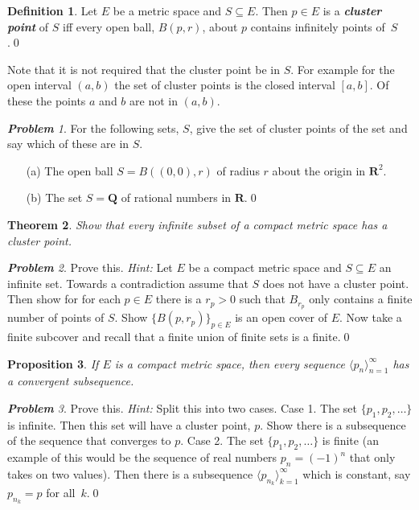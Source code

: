 \documentclass[11pt]{amsart}
\newcommand{\bi}[1]{{\bf\itshape #1\/}}  %
\renewcommand{\(}{\left(}
\renewcommand{\)}{\right)}
\renewcommand{\[}{\left[}
\renewcommand{\]}{\right]}
\newtheorem{thm}{Theorem}
\newtheorem{prop}[thm]{Proposition}
\theoremstyle{definition}
\newtheorem{defn}[thm]{Definition}
\theoremstyle{remark}
\newtheorem{prob}{{\bf Problem}}
\newcommand{\R}{{\mathbf R}}   %
\newcommand{\la}{\langle}
\newcommand{\ra}{\rangle}
\newcommand{\hint}{{\emph{Hint:} }}
\begin{document}
\begin{defn}
Let $E$ be a metric space and $S\subseteq E$.  Then $p\in E$ is a 
\bi{cluster point} of $S$ iff every open ball, $B(p,r)$, about $p$
contains infinitely points of~$S$.\qed
\end{defn}

Note that it is not required that the cluster point be in $S$.  For
example for the open interval $(a,b)$ the set of cluster points is the
closed interval $[a,b]$.  Of these the points $a$ and $b$ are not in $(a,b)$.

\begin{prob}
For the following sets, $S$, give the set of cluster points of the set and
say which of these are in $S$.
\begin{enumerate}
\item[(a)]  The open ball $S=B((0,0),r)$ of radius $r$ about the
  origin in $\R^2$.
\item[(b)] The set $S=\mathbf Q$ of rational numbers in $\R$.\qed
\end{enumerate}
\end{prob}

\begin{thm}
Show that every infinite subset of a compact metric space has a
cluster point.
\end{thm}

\begin{prob}
Prove this. \hint Let $E$ be a compact metric space and $S\subseteq E$
an infinite set.  Towards a contradiction assume that $S$ does not
have a cluster point.  Then show for for each $p\in E$ there is a $r_p>0$ such
that $B_{r_p}$ only contains a finite number of points of $S$.  Show
$\{B(p,r_p)\}_{p\in E}$ is an open cover of $E$.  Now take a finite
subcover and recall that a finite union of finite sets is a finite.\qed
\end{prob}


\begin{prop}
If $E$ is a compact metric space, then every sequence $\la
p_n\ra_{n=1}^\infty$ has a convergent subsequence.
\end{prop}


\begin{prob}
Prove this. \hint  Split this into two cases.  {\sc Case 1.}  The set
$\{p_1,p_2,\ldots\}$ is infinite.  Then this set will have a cluster
point, $p$.  Show there is a subsequence of the sequence that
converges to $p$.  {\sc Case 2.}  The set $\{p_1,p_2,\ldots\}$ is
finite (an example of this would be the sequence of real numbers
$p_n=(-1)^n$ 
that only takes on two values).  Then there is 
a subsequence $\la p_{n_k}\ra_{k=1}^\infty$ which is constant, say
$p_{n_k}=p$ 
for all~$k$.\qed
\end{prob}
\end{document}
